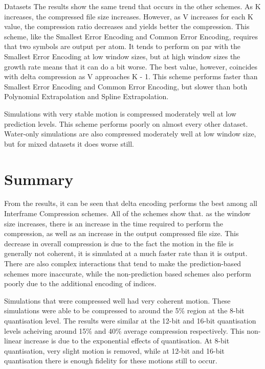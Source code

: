 \documentclass[a4paper,11pt]{report}
\begin{document}
\begin{section}{Datasets}
The results show the same trend that occurs in the other schemes. As K increases, the compressed file size increases. However, as V increases for each K value, the compression ratio decreases and yields better the compression. This scheme, like the Smallest Error Encoding and Common Error Encoding, requires that two symbols are output per atom. It tends to perform on par with the Smallest Error Encoding at low window sizes, but at high window sizes the growth rate means that it can do a bit worse. The best value, however, coincides with delta compression as V approaches K - 1. This scheme performs faster than Smallest Error Encoding and Common Error Encoding, but slower than both Polynomial Extrapolation and Spline Extrapolation.

Simulations with very stable motion is compressed moderately well at low prediction levels. This scheme performs poorly on almost every other dataset. Water-only simulations are also compressed moderately well at low window size, but for mixed datasets it does worse still.

\end{section}

\section{Summary}

From the results, it can be seen that delta encoding performs the best among all Interframe Compression schemes. All of the schemes show that. as the window size increases, there is an increase in the time required to perform the compression, as well as an increase in the output compressed file size. This decrease in overall compression is due to the fact the motion in the file is generally not coherent, it is simulated at a much faster rate than it is output. There are also complex interactions that tend to make the prediction-based schemes more inaccurate, while the non-prediction based schemes also perform poorly due to the additional encoding of indices.

Simulations that were compressed well had very coherent motion. These simulations were able to be compressed to around the 5\% region at the 8-bit quantisation level. The results were similar at the 12-bit and 16-bit quantisation levels acheiving around 15\% and 40\% average compression respectively. This non-linear increase is due to the exponential effects of quantisation. At 8-bit quantisation, very slight motion is removed, while at 12-bit and 16-bit quantisation there is enough fidelity for these motions still to occur.
\end{document}
